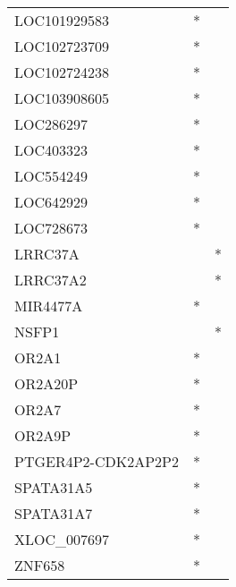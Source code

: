 \begin{tabular}{lcc}
LOC101929583       &  * &         \\
LOC102723709       &  * &         \\
LOC102724238       &  * &         \\
LOC103908605       &  * &         \\
LOC286297          &  * &         \\
LOC403323          &  * &         \\
LOC554249          &  * &         \\
LOC642929          &  * &         \\
LOC728673          &  * &         \\
LRRC37A            &    &       * \\
LRRC37A2           &    &       * \\
MIR4477A           &  * &         \\
NSFP1              &    &       * \\
OR2A1              &  * &         \\
OR2A20P            &  * &         \\
OR2A7              &  * &         \\
OR2A9P             &  * &         \\
PTGER4P2-CDK2AP2P2 &  * &         \\
SPATA31A5          &  * &         \\
SPATA31A7          &  * &         \\
XLOC\_007697        &  * &         \\
ZNF658             &  * &         \\
\bottomrule
\end{tabular}
